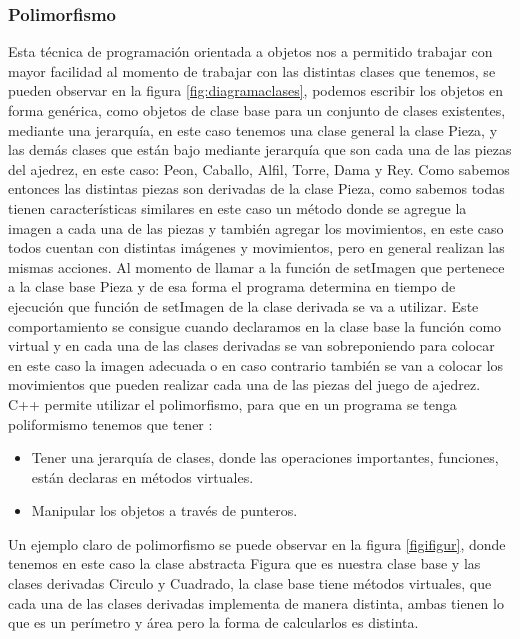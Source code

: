 \documentclass[conference]{IEEEtran}
\newcommand\tab[1][1cm]{\hspace*{#1}}
\begin{document}
        \subsubsection{Polimorfismo}
        Esta técnica de programación orientada a objetos nos a permitido trabajar con mayor facilidad al momento de trabajar con las distintas clases que tenemos, se pueden observar en la figura \ref{fig:diagramaclases}, podemos escribir los objetos en forma genérica, como objetos de clase base para un conjunto de clases existentes, mediante una jerarquía, en este caso tenemos una clase general la clase Pieza, y las demás clases que están bajo mediante jerarquía que son cada una de las piezas del ajedrez, en este caso: Peon, Caballo, Alfil, Torre, Dama y Rey. 
        \newline
        \newline
        \tab[0.55cm] Como sabemos entonces las distintas piezas son derivadas de la clase Pieza, como sabemos todas tienen características similares en este caso un método donde se agregue la imagen a cada una de las piezas y también agregar los movimientos, en este caso todos cuentan con distintas imágenes y movimientos, pero en general realizan las mismas acciones. Al momento de llamar a la función de setImagen que pertenece a la clase base Pieza y de esa forma el programa determina en tiempo de ejecución que función de setImagen de la clase derivada se va a utilizar. Este comportamiento se consigue cuando declaramos en la clase base la función como virtual y en cada una de las clases derivadas se van sobreponiendo para colocar en este caso la imagen adecuada o en caso contrario también se van a colocar los movimientos que pueden realizar cada una de las piezas del juego de ajedrez.
        \newline
        \newline
        \tab[0.55cm] C++ permite utilizar el polimorfismo, para que en un programa se tenga poliformismo tenemos que tener \citep{polimorfismo}:
        \begin{itemize}
            \item Tener una jerarquía de clases, donde las operaciones importantes, funciones, están declaras en métodos virtuales.
            \item Manipular los objetos a través de punteros.
        \end{itemize}
        \newline
        \newline
        \newline
        \tab[0.55cm] Un ejemplo claro de polimorfismo se puede observar en la figura \ref{figifigur}, donde tenemos en este caso la clase abstracta Figura que es nuestra clase base y las clases derivadas Circulo y Cuadrado, la clase base tiene métodos virtuales, que cada una de las clases derivadas implementa de manera distinta, ambas tienen lo que es un perímetro y área pero la forma de calcularlos es distinta.
            
\end{document}
